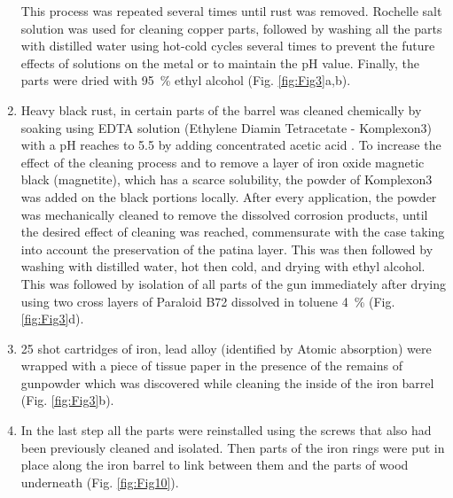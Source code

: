 \begin{enumerate}
	This process was repeated several times until rust was removed. Rochelle salt solution was used for cleaning copper parts, followed by washing all the parts with distilled water using hot-cold cycles several times to prevent the future effects of solutions on the metal or to maintain the pH value. 
	Finally, the parts were dried with \SI{95}{\percent} ethyl alcohol (Fig. \ref{fig:Fig3}a,b).
	\item Heavy black rust, in certain parts of the barrel was cleaned chemically by soaking using EDTA solution (Ethylene Diamin Tetracetate - Komplexon{\small3}) with a pH reaches to \num{5.5} by adding concentrated acetic acid \parencite[225]{Sobhy_2006}. To increase the effect of the cleaning process and to remove a layer of iron oxide magnetic black (magnetite), which has a scarce solubility, the powder of Komplexon3 was added on the black portions locally. 
After every application, the powder was mechanically cleaned to remove the dissolved corrosion products, until the desired effect of cleaning was reached, commensurate with the case taking into account the preservation of the patina layer. This was then followed by washing with distilled water, hot then cold, and drying with ethyl alcohol. 
This was followed by isolation of all parts of the gun immediately after drying using two cross layers of Paraloid B72 dissolved in toluene \SI{4}{\percent} (Fig. \ref{fig:Fig3}d).
	\item 25 shot cartridges of iron, lead alloy (identified by Atomic absorption) were wrapped with a piece of tissue paper in the presence of the remains of gunpowder which was discovered while cleaning the inside of the iron barrel (Fig. \ref{fig:Fig3}b).
	\item In the last step all the parts were reinstalled using the screws that also had been previously cleaned and isolated. Then parts of the iron rings were put in place along the iron barrel to link between them and the parts of wood underneath (Fig. \ref{fig:Fig10}).
\end{enumerate}

